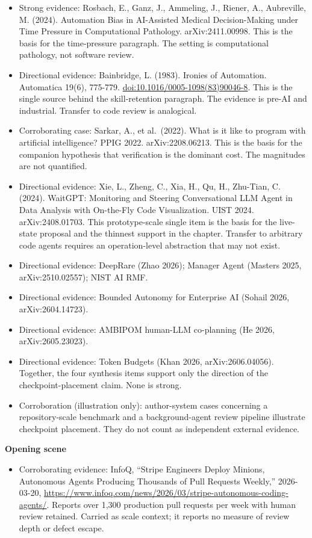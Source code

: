 \begin{itemize}
\tightlist
\item
  Strong evidence: Rosbach, E., Ganz, J., Ammeling, J., Riener, A., Aubreville, M. (2024). Automation Bias in AI-Assisted Medical Decision-Making under Time Pressure in Computational Pathology. arXiv:2411.00998. This is the basis for the time-pressure paragraph. The setting is computational pathology, not software review.
\item
  Directional evidence: Bainbridge, L. (1983). Ironies of Automation. Automatica 19(6), 775-779. \url{doi:10.1016/0005-1098(83)90046-8}. This is the single source behind the skill-retention paragraph. The evidence is pre-AI and industrial. Transfer to code review is analogical.
\item
  Corroborating case: Sarkar, A., et al.~(2022). What is it like to program with artificial intelligence? PPIG 2022. arXiv:2208.06213. This is the basis for the companion hypothesis that verification is the dominant cost. The magnitudes are not quantified.
\item
  Directional evidence: Xie, L., Zheng, C., Xia, H., Qu, H., Zhu-Tian, C. (2024). WaitGPT: Monitoring and Steering Conversational LLM Agent in Data Analysis with On-the-Fly Code Visualization. UIST 2024. arXiv:2408.01703. This prototype-scale single item is the basis for the live-state proposal and the thinnest support in the chapter. Transfer to arbitrary code agents requires an operation-level abstraction that may not exist.
\item
  Directional evidence: DeepRare (Zhao 2026); Manager Agent (Masters 2025, arXiv:2510.02557); NIST AI RMF.
\item
  Directional evidence: Bounded Autonomy for Enterprise AI (Sohail 2026, arXiv:2604.14723).
\item
  Directional evidence: AMBIPOM human-LLM co-planning (He 2026, arXiv:2605.23023).
\item
  Directional evidence: Token Budgets (Khan 2026, arXiv:2606.04056). Together, the four synthesis items support only the direction of the checkpoint-placement claim. None is strong.
\item
  Corroboration (illustration only): author-system cases concerning a repository-scale benchmark and a background-agent review pipeline illustrate checkpoint placement. They do not count as independent external evidence.
\end{itemize}

\textbf{Opening scene}

\begin{itemize}
\tightlist
\item
  Corroborating evidence: InfoQ, ``Stripe Engineers Deploy Minions, Autonomous Agents Producing Thousands of Pull Requests Weekly,'' 2026-03-20, \url{https://www.infoq.com/news/2026/03/stripe-autonomous-coding-agents/}. Reports over 1,300 production pull requests per week with human review retained. Carried as scale context; it reports no measure of review depth or defect escape.
\end{itemize}
